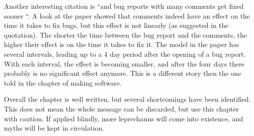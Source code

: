 Another interesting citation is ``and bug reports with many comments get fixed sooner \cite{Hooimeijer:2007:MBR:1321631.1321639}``.
A look at the paper showed that comments indeed have an effect on the time it takes to fix bugs, but this effect is not linearly (as suggested in the quotation).
The shorter the time between the bug report and the comments, the higher their effect is on the time it takes to fix it. 
The model in the paper has several intervals, leading up to a 4 day period after the opening of a bug report. 
With each interval, the effect is becoming smaller, and after the four days there probably is no significant effect anymore.
This is a different story then the one told in the chapter of making software.

Overall the chapter is well written, but several shortcomings have been identified. 
This does not mean the whole message can be discarded, but use this chapter with caution.
If applied blindly, more leprechauns will come into existence, and myths will be kept in circulation.
